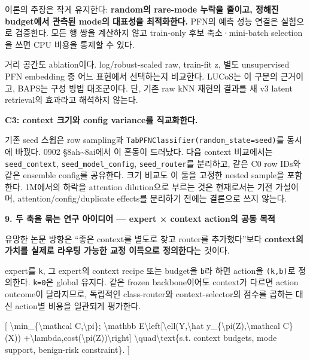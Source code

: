 이론의 주장은 작게 유지한다: \textbf{random의 rare-mode 누락을 줄이고, 정해진 budget에서 관측된 mode의 대표성을 최적화한다.} PFN의 예측 성능 연결은 실험으로 검증한다. 모든 행 쌍을 계산하지 않고 train-only 후보 축소·mini-batch selection을 쓰면 CPU 비용을 통제할 수 있다.

거리 공간도 ablation이다. log/\allowbreak{}robust-scaled raw, train-fit z, 별도 unsupervised PFN embedding 중 어느 표현에서 선택하는지 비교한다. LUCoS는 이 구분의 근거이고, BAPS는 구성 방법 대조군이다. 단, 기존 raw kNN 재현의 결과를 새 v3 latent retrieval의 효과라고 해석하지 않는다.

\textbf{C3: context 크기와 config variance를 직교화한다.}

기존 seed 스윕은 row sampling과 \texttt{TabPFNCl\allowbreak{}assifier\allowbreak{}(random\_\allowbreak{}\allowbreak{}state=\allowbreak{}\allowbreak{}se\allowbreak{}ed)}를 동시에 바꿨다. 0902 §8ah\textasciitilde{}8ai에서 이 혼동이 드러났다. 다음 context 비교에서는 \texttt{seed\_\allowbreak{}\allowbreak{}con\allowbreak{}text}, \texttt{seed\_\allowbreak{}\allowbreak{}mod\allowbreak{}el\_\allowbreak{}\allowbreak{}confi\allowbreak{}g}, \texttt{seed\_\allowbreak{}\allowbreak{}rou\allowbreak{}ter}를 분리하고, 같은 C0 row IDs와 같은 ensemble config를 공유한다. 크기 비교도 이 둘을 고정한 nested sample을 포함한다. 1M에서의 하락을 attention dilution으로 부르는 것은 현재로서는 기전 가설이며, attention/\allowbreak{}config/\allowbreak{}duplicate effects를 분리하기 전에는 결론으로 쓰지 않는다.

\textbf{9. 두 축을 묶는 연구 아이디어 — expert × context action의 공동 목적}

유망한 논문 방향은 “좋은 context를 별도로 찾고 router를 추가했다”보다 \textbf{context의 가치를 실제로 라우팅 가능한 교정 이득으로 정의한다}는 것이다.

expert를 \texttt{k}, 그 expert의 context recipe 또는 budget을 \texttt{b}라 하면 action을 \texttt{(k,\allowbreak{}b)}로 정의한다. \texttt{k=\allowbreak{}\allowbreak{}0}은 global 유지다. 같은 frozen backbone이어도 context가 다르면 action outcome이 달라지므로, 독립적인 class-router와 context-selector의 점수를 곱하는 대신 action별 비용을 일관되게 평가한다.

[ \textbackslash{}min\_\allowbreak{}\{\textbackslash{}mathcal C,\textbackslash{}pi\}; \textbackslash{}mathbb E\textbackslash{}left[\textbackslash{}ell(Y,\textbackslash{}hat y\_\allowbreak{}\{\textbackslash{}pi(Z),\textbackslash{}mathcal C\}(X)) +\allowbreak{}\textbackslash{}lambda,cost(\textbackslash{}pi(Z))\textbackslash{}right] \textbackslash{}quad\textbackslash{}text\{s.t. context budgets, mode support, benign-risk constraint\}. ]

